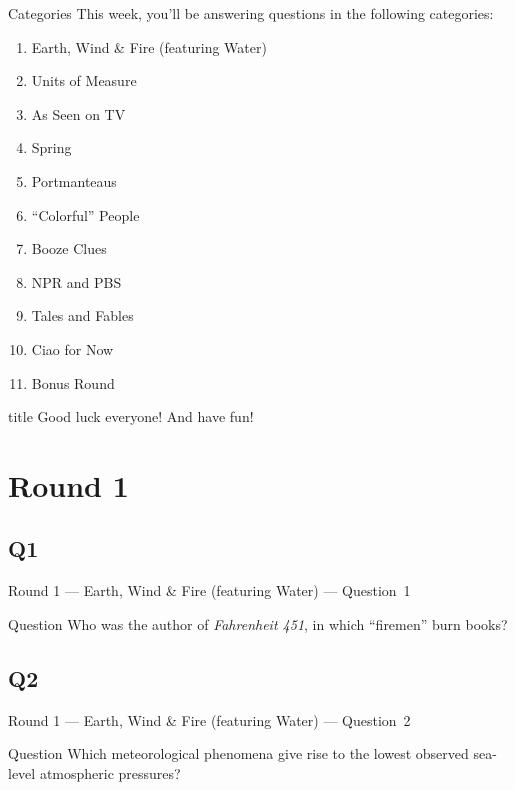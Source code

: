 \documentclass[11pt]{beamer}
\begin{document}
\begingroup{}
\begingroup{}
\begin{frame}[t]{Categories}
This week, you'll be answering questions in the following categories:
\begin{enumerate}
\item Earth, Wind \& Fire (featuring Water)
\item Units of Measure
\item As Seen on TV
\item Spring
\item Portmanteaus
\item ``Colorful'' People
\item Booze Clues
\item NPR and PBS
\item Tales and Fables
\item Ciao for Now
\item Bonus Round
\end{enumerate}
\end{frame}
\endgroup{}

\begingroup{}
\begin{frame}
\vfill{}
\begin{beamercolorbox}[sep=8pt,center,shadow=true,rounded=true]{title}
Good luck everyone! And have fun!
\end{beamercolorbox}
\vfill{}
\end{frame}
\endgroup{}
\def\thisSectionName{Earth, Wind \& Fire (featuring Water)}
\section{Round 1}
\subsection*{Q1}
\begin{frame}[t]{Round 1 --- Earth, Wind \& Fire (featuring Water) --- \mbox{Question 1}}
\vspace{-0.5em}
\begin{block}{Question}
Who was the author of \emph{Fahrenheit 451}, in which ``firemen'' burn books?
\end{block}
\end{frame}
\subsection*{Q2}
\begin{frame}[t]{Round 1 --- Earth, Wind \& Fire (featuring Water) --- \mbox{Question 2}}
\vspace{-0.5em}
\begin{block}{Question}
Which meteorological phenomena give rise to the lowest observed sea-level atmospheric pressures?
\end{block}
\end{frame}
\end{document}
